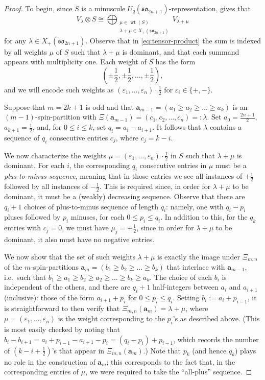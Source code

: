 \documentclass[10pt]{amsart}
\numberwithin{equation}{section}
\theoremstyle{definition}
\newcommand{\son}[1][2n+1]{\mathfrak{so}_{#1}}
\newcommand{\ab}{\mathbf{a}}
\newcommand{\ep}{\varepsilon}
\begin{document}
\begin{proof}
To begin, since $S$ is a minuscule $U_q(\son)$-representation, 
\cite[Corollary 30.7]{EtingofLie} gives that
\begin{equation}\label{eq:tensor-product}
V_{\lambda}\otimes S \cong 
\bigoplus_{\substack{\mu\in  \operatorname{wt}(S) \\ \lambda + \mu \in X_+(\son)}} 
	V_{\lambda+ \mu} 
\end{equation}
for any $\lambda\in X_+(\son)$.
Observe that in \eqref{eq:tensor-product} 
the sum is indexed by all weights $\mu$ of $S$ such that $\lambda + \mu$ is dominant, 
and that each summand appears with multiplicity one. 
Each weight of $S$ has the form
\[ 
\left(\pm \frac{1}{2}, \pm \frac{1}{2}, \ldots, \pm \frac{1}{2}\right),
\]
and we will encode such weights as $(\ep_1, \ldots, \ep_n) \cdot \frac{1}{2}$ for $\ep_i \in \{+, -\}$.

Suppose that $m = 2k+1$ is odd and that $\ab_{m-1} = (a_1 \ge a_2 \ge \ldots \ge a_k)$ 
is an $(m-1)$-spin-partition with $\Xi(\ab_{m-1}) = (c_1, c_2, \ldots, c_n) =: \lambda$. 
Set $a_0 = \frac{2n+1}{2}$, $a_{k+1} = \frac{1}{2}$, and, for $0 \le i \le k$, set $q_i = a_i - a_{i+1}$.
It follows that $\lambda$ contains a sequence of $q_i$ consecutive entries $c_j$, where $c_j = k - i$.

We now characterize the weights $\mu = (\ep_1, \ldots, \ep_n) \cdot \frac{1}{2} $ in $S$ such that $\lambda + \mu$ is dominant. 
For each $i$, the corresponding $q_i$ consecutive entries in $\mu$ must be a \emph{plus-to-minus sequence}, 
meaning that in those entries we see all instances of $+\frac{1}{2}$ followed by all instances of $-\frac{1}{2}$.
This is required since, in order for $\lambda + \mu$ to be dominant, it must be a (weakly) decreasing sequence. 
Observe that there are $q_i + 1$ choices of plus-to-minus sequence of length $q_i$:  
namely, one with $q_i - p_i$ pluses followed by $p_i$ minuses, for each $0 \le p_i \le q_i$. 
In addition to this, for the $q_k$ entries with $c_j = 0$, we must have $\mu_j = +\frac{1}{2}$, 
since in order for $\lambda + \mu$ to be dominant, it also must have no negative entries.

We now show that the set of such weights $\lambda + \mu$ is exactly the image under $\Xi_{m,n}$ 
of the $m$-spin-partitions $\ab_m=(b_1 \ge b_2 \ge \ldots \ge b_k)$ that interlace with $\ab_{m-1}$, 
i.e.~such that $b_1 \ge a_1 \ge b_2 \ge a_2 \ge \ldots \ge b_k \ge a_k$.
The choice of each $b_i$ is independent of the others, and there are $q_i + 1$ half-integers between $a_i$ and $a_{i+1}$ (inclusive): 
those of the form $a_{i+1} + p_i$ for $0 \le p_i \le q_i$. 
Setting $b_i := a_i + p_{i-1}$, 
it is straightforward to then verify that 
$\Xi_{m,n}(\ab_m) = \lambda + \mu$,
where $\mu = (\ep_1, \ldots, \ep_n)$ is the weight corresponding to the $p_i$'s as described above.
(This is most easily checked by noting that $b_i - b_{i+1} = a_i + p_{i-1} - a_{i+1} - p_i = (q_i - p_i) + p_{i-1}$, 
which records the number of $(k-i+\tfrac{1}{2})$'s that appear in $\Xi_{m,n}(\ab_m)$.)
Note that $p_k$ (and hence $q_k$) plays no role in the construction of $\ab_m$; 
this corresponds to the fact that, in the corresponding entries of $\mu$, 
we were required to take the ``all-plus'' sequence.


\end{proof}
\end{document}
